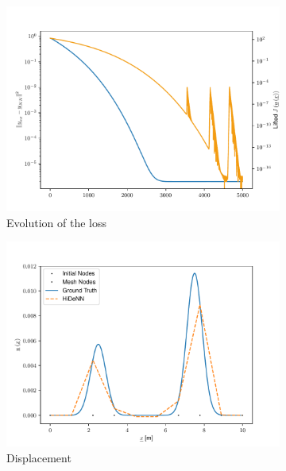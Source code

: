 \begin{figure}
    \begin{subfigure}{0.3\linewidth}
        \centering
        \includegraphics[width=\linewidth]{Figures/Loss_Comaprison_10_Frozen.pdf}
        \caption{Evolution of the loss}
    \end{subfigure}
    \begin{subfigure}{0.3\linewidth}
        \centering
        \includegraphics[width=\linewidth]{Figures/Solution_displacement_10_Frozen.pdf}
        \caption{Displacement}
    \end{subfigure}
    \begin{subfigure}{0.3\linewidth}
        \centering

\end{subfigure}
\end{figure}
